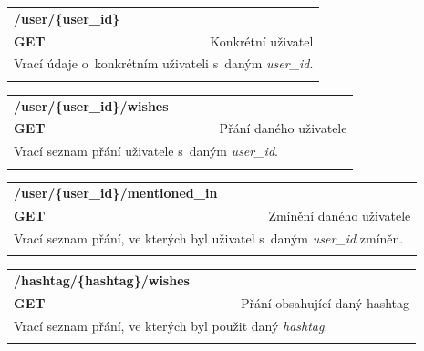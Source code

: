 \documentclass[thesis=B,czech]{FITthesis}[2012/06/26]
\begin{document}
\begin{table}[h]
\begin{tabular}{llllr}
\rowcolor[HTML]{EFEFEF}
\large \textbf{/user/\{user\_id\}}        &         &                 &        & \multicolumn{1}{l}{}                \\
\rowcolor[HTML]{EFEFEF}
\textbf{GET}          &         &                 &        & Konkrétní uživatel                        \\
\multicolumn{5}{l}{\parbox[t]{12.8cm}{Vrací údaje o~konkrétním uživateli s~daným \textit{user\_id}. }  } \\  
 & & & & \\
\end{tabular}
\end{table}


\begin{table}[h]
\begin{tabular}{llllr}
\rowcolor[HTML]{EFEFEF}
\large \textbf{/user/\{user\_id\}/wishes}        &         &                 &        & \multicolumn{1}{l}{}                \\
\rowcolor[HTML]{EFEFEF}
\textbf{GET}          &         &                 &        & Přání daného uživatele                        \\
\multicolumn{5}{l}{\parbox[t]{12.8cm}{Vrací seznam přání uživatele s~daným \textit{user\_id}. }  } \\  
 & & & & \\
\end{tabular}
\end{table}

\begin{table}[h]
\begin{tabular}{llllr}
\rowcolor[HTML]{EFEFEF}
\large \textbf{/user/\{user\_id\}/mentioned\_in}        &         &                 &        & \multicolumn{1}{l}{}                \\
\rowcolor[HTML]{EFEFEF}
\textbf{GET}          &         &                 &        & Zmínění daného uživatele                        \\
\multicolumn{5}{l}{\parbox[t]{12.8cm}{Vrací seznam přání, ve kterých byl uživatel s~daným \textit{user\_id} zmíněn. }  } \\  
 & & & & \\
\end{tabular}
\end{table}


\begin{table}[h]
\begin{tabular}{llllr}
\rowcolor[HTML]{EFEFEF}
\large \textbf{/hashtag/\{hashtag\}/wishes}        &         &                 &        & \multicolumn{1}{l}{}                \\
\rowcolor[HTML]{EFEFEF}
\textbf{GET}          &         &                 &        & Přání obsahující daný hashtag                       \\
\multicolumn{5}{l}{\parbox[t]{12.8cm}{Vrací seznam přání, ve kterých byl použit daný \textit{hashtag}. }  } \\  
 & & & & \\
\end{tabular}
\end{table}
\end{document}
